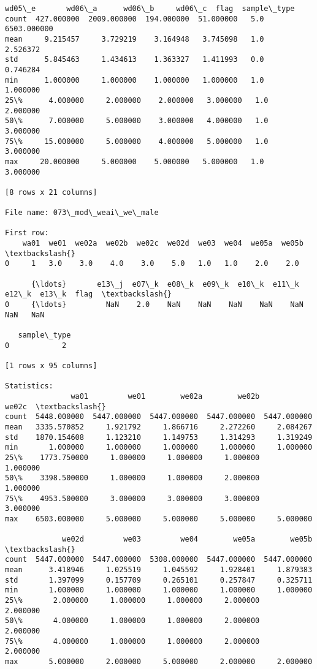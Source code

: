\documentclass[11pt]{article}
\begin{document}
\begin{Verbatim}[commandchars=\\\{\}]
           wd05\_e       wd06\_a      wd06\_b     wd06\_c  flag  sample\_type  
count  427.000000  2009.000000  194.000000  51.000000   5.0  6503.000000  
mean     9.215457     3.729219    3.164948   3.745098   1.0     2.526372  
std      5.845463     1.434613    1.363327   1.411993   0.0     0.746284  
min      1.000000     1.000000    1.000000   1.000000   1.0     1.000000  
25\%      4.000000     2.000000    2.000000   3.000000   1.0     2.000000  
50\%      7.000000     5.000000    3.000000   4.000000   1.0     3.000000  
75\%     15.000000     5.000000    4.000000   5.000000   1.0     3.000000  
max     20.000000     5.000000    5.000000   5.000000   1.0     3.000000  

[8 rows x 21 columns]

File name: 073\_mod\_weai\_we\_male

First row: 
    wa01  we01  we02a  we02b  we02c  we02d  we03  we04  we05a  we05b  \textbackslash{}
0     1   3.0    3.0    4.0    3.0    5.0   1.0   1.0    2.0    2.0   

      {\ldots}       e13\_j  e07\_k  e08\_k  e09\_k  e10\_k  e11\_k  e12\_k  e13\_k  flag  \textbackslash{}
0     {\ldots}         NaN    2.0    NaN    NaN    NaN    NaN    NaN    NaN   NaN   

   sample\_type  
0            2  

[1 rows x 95 columns]

Statistics: 
               wa01         we01        we02a        we02b        we02c  \textbackslash{}
count  5448.000000  5447.000000  5447.000000  5447.000000  5447.000000   
mean   3335.570852     1.921792     1.866716     2.272260     2.084267   
std    1870.154608     1.123210     1.149753     1.314293     1.319249   
min       1.000000     1.000000     1.000000     1.000000     1.000000   
25\%    1773.750000     1.000000     1.000000     1.000000     1.000000   
50\%    3398.500000     1.000000     1.000000     2.000000     1.000000   
75\%    4953.500000     3.000000     3.000000     3.000000     3.000000   
max    6503.000000     5.000000     5.000000     5.000000     5.000000   

             we02d         we03         we04        we05a        we05b  \textbackslash{}
count  5447.000000  5447.000000  5308.000000  5447.000000  5447.000000   
mean      3.418946     1.025519     1.045592     1.928401     1.879383   
std       1.397099     0.157709     0.265101     0.257847     0.325711   
min       1.000000     1.000000     1.000000     1.000000     1.000000   
25\%       2.000000     1.000000     1.000000     2.000000     2.000000   
50\%       4.000000     1.000000     1.000000     2.000000     2.000000   
75\%       4.000000     1.000000     1.000000     2.000000     2.000000   
max       5.000000     2.000000     5.000000     2.000000     2.000000   


\end{Verbatim}
\end{document}
